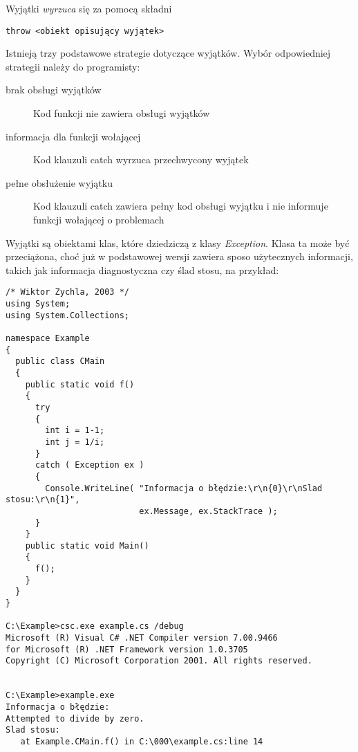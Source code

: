 Wyjątki {\em wyrzuca} się za pomocą składni

\begin{scriptsize}
\begin{verbatim}
throw <obiekt opisujący wyjątek>
\end{verbatim}
\end{scriptsize}

Istnieją trzy podstawowe strategie dotyczące wyjątków. Wybór odpowiedniej strategii należy do programisty:

\begin{description}
\item [brak obsługi wyjątków] Kod funkcji nie zawiera obsługi wyjątków
\item [informacja dla funkcji wołającej] Kod klauzuli catch wyrzuca przechwycony wyjątek 
\item [pełne obsłużenie wyjątku] Kod klauzuli catch zawiera pełny kod obsługi wyjątku i nie informuje funkcji
wołającej o problemach
\end{description}

Wyjątki są obiektami klas, które dziedziczą z klasy {\em Exception}. Klasa ta może być przeciążona, choć
już w podstawowej wersji zawiera sposo użytecznych informacji, takich jak informacja diagnostyczna czy
ślad stosu, na przykład:

\begin{scriptsize}
\begin{verbatim}
/* Wiktor Zychla, 2003 */
using System;
using System.Collections;

namespace Example
{ 
  public class CMain
  {    
    public static void f()
    {
      try
      {
        int i = 1-1;
        int j = 1/i; 
      }
      catch ( Exception ex )
      {
        Console.WriteLine( "Informacja o błędzie:\r\n{0}\r\nSlad stosu:\r\n{1}", 
                           ex.Message, ex.StackTrace );
      }
    }
    public static void Main()
    {
      f();
    }
  }
}

C:\Example>csc.exe example.cs /debug
Microsoft (R) Visual C# .NET Compiler version 7.00.9466
for Microsoft (R) .NET Framework version 1.0.3705
Copyright (C) Microsoft Corporation 2001. All rights reserved.


C:\Example>example.exe
Informacja o błędzie:
Attempted to divide by zero.
Slad stosu:
   at Example.CMain.f() in C:\000\example.cs:line 14
\end{verbatim}
\end{scriptsize}
